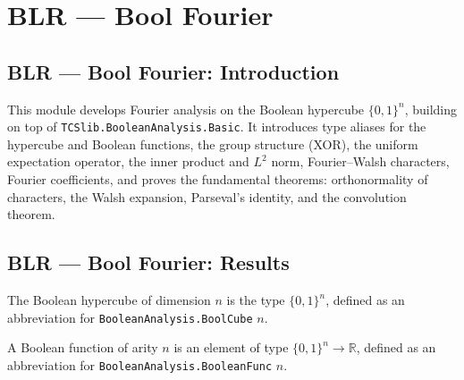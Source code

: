 \section{BLR --- Bool Fourier}
\subsection*{BLR --- Bool Fourier: Introduction}

This module develops Fourier analysis on the Boolean hypercube $\{0,1\}^n$, building on
top of \texttt{TCSlib.BooleanAnalysis.Basic}.  It introduces type aliases for the
hypercube and Boolean functions, the group structure (XOR), the uniform expectation
operator, the inner product and $L^2$ norm, Fourier–Walsh characters, Fourier
coefficients, and proves the fundamental theorems: orthonormality of characters, the
Walsh expansion, Parseval's identity, and the convolution theorem.

\subsection*{BLR --- Bool Fourier: Results}

\begin{definition}[Hypercube]
\label{BoolFourier.hypercube}
\leanok
{}
The Boolean hypercube of dimension $n$ is the type $\{0,1\}^n$, defined as an
abbreviation for \texttt{BooleanAnalysis.BoolCube} $n$.
\end{definition}

\begin{definition}
\label{BoolFourier.BoolFun}
\leanok
{}
A Boolean function of arity $n$ is an element of type $\{0,1\}^n \to \mathbb{R}$,
defined as an abbreviation for \texttt{BooleanAnalysis.BooleanFunc} $n$.
\end{definition}

